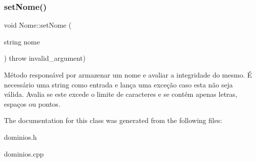 \subsubsection{\texorpdfstring{set\+Nome()}{setNome()}}
{\footnotesize\ttfamily void Nome\+::set\+Nome (\begin{DoxyParamCaption}\item[{string}]{nome }\end{DoxyParamCaption}) throw  invalid\+\_\+argument) }

Método responsável por armazenar um nome e avaliar a integridade do mesmo. É necessário uma string como entrada e lança uma exceção caso esta não seja válida. Avalia se este excede o limite de caracteres e se contém apenas letras, espaços ou pontos. 

The documentation for this class was generated from the following files\+:\begin{DoxyCompactItemize}
\item 
dominios.\+h\item 
dominios.\+cpp\end{DoxyCompactItemize}
